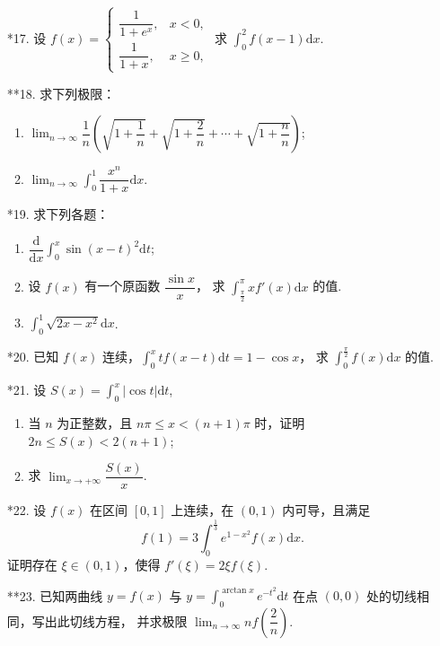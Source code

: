 \begin{enumerate}
    \item[*17.] 设 $f(x)=\begin{cases}
        \dfrac{1}{1+e^x},&x<0,\\
        \dfrac{1}{1+x},&x\geqslant0,
    \end{cases}$ 求 $\displaystyle\int_0^2f(x-1)\text{d}x$.

    \item[**18.] 求下列极限：
    \begin{enumerate}[(1)]\setlength{\itemsep}{5pt}\setlength{\topsep}{15pt}
        \item $\displaystyle\lim_{n\to\infty}\dfrac{1}{n}\left(\sqrt{1+\dfrac{1}{n}}+\sqrt{1+\dfrac{2}{n}}+\cdots+\sqrt{1+\dfrac{n}{n}}\right)$;
        \item $\displaystyle\lim_{n\to\infty}\int_0^1\dfrac{x^n}{1+x}\text{d}x$.
    \end{enumerate}

    \item[*19.] 求下列各题：
    \begin{enumerate}[(1)]\setlength{\itemsep}{5pt}\setlength{\topsep}{15pt}
        \item $\displaystyle\dfrac{\text{d}}{\text{d}x}\int_0^x\sin(x-t)^2\text{d}t$;
        \item 设 $f(x)$ 有一个原函数 $\dfrac{\sin x}{x}$，
        求 $\displaystyle\int_{\frac{\pi}{2}}^{\pi}xf'(x)\text{d}x$ 的值.
        \item $\displaystyle \int_0^1\sqrt{2x-x^2}\text{d}x$.
    \end{enumerate}

    \item[*20.] 已知 $f(x)$ 连续，$\displaystyle \int_0^xtf(x-t)\text{d}t=1-\cos x$，
    求 $\displaystyle\int_0^{\frac{\pi}{2}}f(x)\text{d}x$ 的值.

    \item[*21.] 设 $\displaystyle S(x)=\int_0^x|\cos t|\text{d}t$,
    \begin{enumerate}[(1)]\setlength{\itemsep}{5pt}\setlength{\topsep}{15pt}
        \item 当 $n$ 为正整数，且 $n\pi\leqslant x<(n+1)\pi$ 时，证明 $2n\leqslant S(x)< 2(n+1)$;
        \item 求 $\displaystyle\lim_{x\to+\infty}\dfrac{S(x)}{x}$.
    \end{enumerate}

    \item[*22.] 设 $f(x)$ 在区间 $[0,1]$ 上连续，在 $(0,1)$ 内可导，且满足
    \[
        f(1)=3\int_0^{\frac{1}{3}}e^{1-x^2}f(x)\text{d}x.
    \] 
    证明存在 $\xi\in(0,1)$，使得 $f'(\xi)=2\xi f(\xi)$.

    \item[**23.] 已知两曲线 $y=f(x)$ 与 $\displaystyle y=\int_0^{\arctan x}e^{-t^2}\text{d}t$ 
    在点 $(0,0)$ 处的切线相同，写出此切线方程，
    并求极限 $\displaystyle \lim_{n\to\infty} nf\left(\dfrac{2}{n}\right)$.

\end{enumerate}

